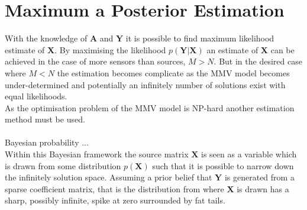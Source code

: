 \section{Maximum a Posterior Estimation}
With the knowledge of $\mathbf{A}$ and $\mathbf{Y}$ it is possible to find maximum likelihood estimate of $\textbf{X}$. By maximising the likelihood $p(\mathbf{Y} \vert \mathbf{X})$ an estimate of $\mathbf{X}$ can be achieved in the case of more sensors than sources, $M > N$. But in the desired case where $M < N$ the estimation becomes complicate as the MMV model becomes under-determined and potentially an infinitely number of solutions exist with equal likelihoods.
\\
As the optimisation problem of the MMV model is NP-hard another estimation method must be used.
\\ \\
Bayesian probability  ... \\
Within this Bayesian framework the source matrix $\mathbf{X}$ is seen as a variable which is drawn from some distribution $p(\mathbf{X})$ such that it is possible to narrow down the infinitely solution space. Assuming a prior belief that $\textbf{Y}$ is generated from a sparse coefficient matrix, that is the distribution from where $\textbf{X}$ is drawn has a sharp, possibly infinite, spike at zero surrounded by fat tails.     
